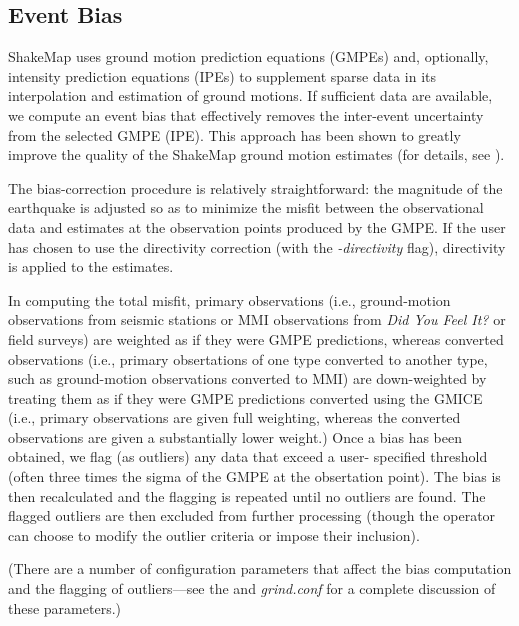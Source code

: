 \documentclass[letterpaper,10pt,english]{sphinxmanual}
\begin{document}
\subsection{Event Bias}
\label{tg_processing:event-bias}\label{tg_processing:sec-event-bias}
ShakeMap uses ground motion prediction equations (GMPEs) and, optionally, intensity prediction
equations (IPEs) to supplement sparse data in its interpolation and estimation of ground
motions. If sufficient data are available, we compute an event bias that effectively
removes the inter-event uncertainty from the selected GMPE (IPE). This approach has
been shown to greatly improve the quality of the ShakeMap ground motion estimates (for
details, see {\hyperref[references:worden2012]{}}).

The bias-correction procedure is relatively straightforward: the magnitude of the
earthquake is adjusted so as to minimize the misfit between the observational data and
estimates at the observation points produced by the GMPE. If the user has chosen to use
the directivity correction (with the \emph{-directivity} flag), directivity is applied to the
estimates.

In computing the total misfit, primary observations (i.e., ground-motion observations from
seismic stations or MMI observations from \emph{Did You Feel It?} or field surveys) are weighted as
if they were GMPE
predictions, whereas converted observations (i.e., primary obsertations of one type converted to
another type, such as ground-motion observations converted to MMI) are down-weighted by treating
them as if they were GMPE predictions converted using the GMICE (i.e., primary observations are
given full weighting, whereas the converted observations are given a substantially lower
weight.) Once a bias has been obtained, we flag (as outliers) any data that exceed a user-
specified threshold (often three times the sigma of the GMPE at the obsertation point). The bias is then
recalculated and the flagging is repeated until no outliers are found. The flagged outliers
are then excluded from further processing (though the operator can choose to modify the
outlier criteria or impose their inclusion).

(There are a number of configuration parameters that affect the bias computation and the
flagging of outliers---see the {\hyperref[software_guide:sm35\string-software\string-guide]{}} and \emph{grind.conf}
for a complete discussion of these parameters.)
\end{document}
